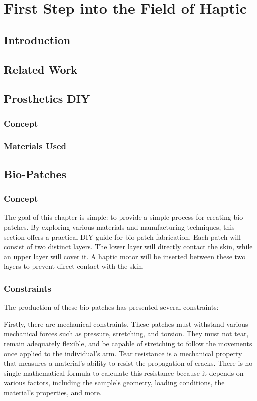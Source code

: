 \chapter{First Step into the Field of Haptic}
\section{Introduction}

\section{Related Work}

\section{Prosthetics DIY}
\subsection{Concept}
\subsection{Materials Used}


\section{Bio-Patches}
\subsection{Concept}
The goal of this chapter is simple: to provide a simple process for creating bio-patches. By exploring various materials and manufacturing techniques, this section offers a practical DIY guide for bio-patch fabrication. Each patch will consist of two distinct layers. The lower layer will directly contact the skin, while an upper layer will cover it. A haptic motor will be inserted between these two layers to prevent direct contact with the skin.

\subsection{Constraints}
The production of these bio-patches has presented several constraints:

Firstly, there are mechanical constraints. These patches must withstand various mechanical forces such as pressure, stretching, and torsion. They must not tear, remain adequately flexible, and be capable of stretching to follow the movements once applied to the individual's arm. Tear resistance is a mechanical property that measures a material's ability to resist the propagation of cracks. There is no single mathematical formula to calculate this resistance because it depends on various factors, including the sample's geometry, loading conditions, the material's properties, and more.

